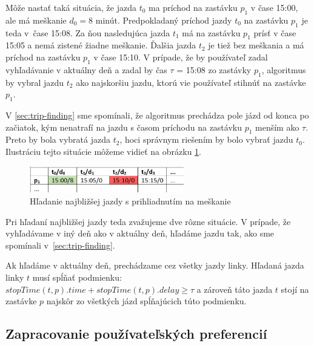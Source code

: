 Môže nastať taká situácia, že jazda $t_0$ ma príchod na zastávku $p_1$ v čase 15:00, ale má meškanie $d_0=8$ minút. Predpokladaný príchod jazdy $t_0$ na zastávku $p_1$ je teda v~čase 15:08. Za ňou nasledujúca jazda $t_1$ má na zastávku $p_1$ prísť v čase 15:05 a nemá zistené žiadne meškanie. Ďalšia jazda $t_2$ je tiež bez meškania a má príchod na zastávku $p_1$ v čase 15:10. V prípade, že by používateľ zadal vyhľadávanie v aktuálny deň a zadal by čas $\tau$ = 15:08 zo zastávky $p_1$, algoritmus by vybral jazdu $t_2$ ako najskoršiu jazdu, ktorú vie používateľ stihnúť na zastávke $p_1$.

V \ref{sec:trip-finding} sme spomínali, že algoritmus prechádza pole jázd od konca po začiatok, kým nenatrafí na jazdu s časom príchodu na zastávku $p_1$ menším ako $\tau$. Preto by bola vybratá jazda $t_2$, hoci správnym riešením by bolo vybrať jazdu $t_0$. Ilustráciu tejto situácie môžeme vidieť na obrázku \ref{fig:shedule-delays}. 

\begin{figure}[H]
\centerline{\includegraphics[width=0.6\textwidth]{images/shedule-delays}}
\caption[Hľadanie najbližšej jazdy s prihliadnutím na meškanie]{Hľadanie najbližšej jazdy s prihliadnutím na meškanie}
\label{fig:shedule-delays}
\end{figure} 

Pri hľadaní najbližšej jazdy teda zvažujeme dve rôzne situácie. V prípade, že vyhľadávame v iný deň ako v aktuálny deň, hľadáme jazdu tak, ako sme spomínali v~\ref{sec:trip-finding}. 

Ak hľadáme v aktuálny deň, prechádzame cez všetky jazdy linky. Hľadaná jazda linky $t$ musí spĺňať podmienku:
$stopTime(t, p).time + stopTime(t, p).delay \geq \tau$ a zároveň táto jazda $t$ stojí na zastávke $p$ najskôr zo všetkých jázd spĺňajúcich túto podmienku.

\subsection{Zapracovanie používateľských preferencií}
